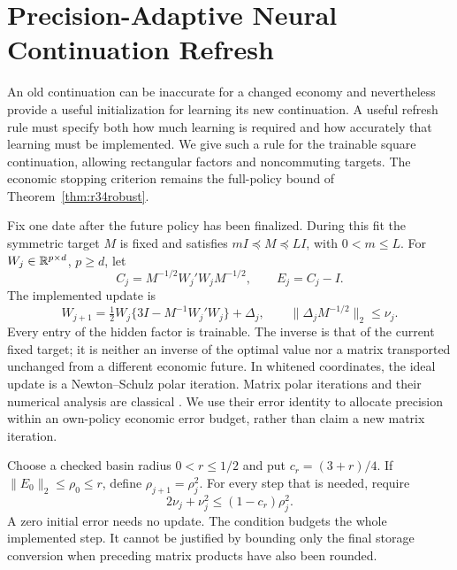 \section{Precision-Adaptive Neural Continuation Refresh}
\label{sec:r37precision}
An old continuation can be inaccurate for a changed economy and nevertheless
provide a useful initialization for learning its new continuation. A useful
refresh rule must specify both how much learning is required and how accurately
that learning must be implemented. We give such a rule for the trainable
square continuation, allowing rectangular factors and noncommuting targets.
The economic stopping criterion remains the full-policy bound of
Theorem~\ref{thm:r34robust}.

Fix one date after the future policy has been finalized. During this fit the
symmetric target $M$ is fixed and satisfies $mI\preceq M\preceq LI$, with
$0<m\leq L$. For $W_j\in\mathbb R^{p\times d}$, $p\geq d$, let
\[
 C_j=M^{-1/2}W_j'W_jM^{-1/2},\qquad E_j=C_j-I.
\]
The implemented update is
\begin{equation}\label{eq:r37update}
 W_{j+1}=\tfrac12 W_j\{3I-M^{-1}W_j'W_j\}+\Delta_j,
 \qquad \|\Delta_jM^{-1/2}\|_2\leq\nu_j.
\end{equation}
Every entry of the hidden factor is trainable. The inverse is that of the
current fixed target; it is neither an inverse of the optimal value nor a
matrix transported unchanged from a different economic future. In whitened
coordinates, the ideal update is a Newton--Schulz polar iteration. Matrix
polar iterations and their numerical analysis are classical
\citep{r37higham2008}. We use their error identity to allocate precision within
an own-policy economic error budget, rather than claim a new matrix iteration.

Choose a checked basin radius $0<r\leq1/2$ and put $c_r=(3+r)/4$. If
$\|E_0\|_2\leq\rho_0\leq r$, define $\rho_{j+1}=\rho_j^2$. For every
step that is needed, require
\begin{equation}\label{eq:r37precision}
 2\nu_j+\nu_j^2\leq(1-c_r)\rho_j^2.
\end{equation}
A zero initial error needs no update. The condition budgets the whole
implemented step. It cannot be justified by bounding only the final storage
conversion when preceding matrix products have also been rounded.

